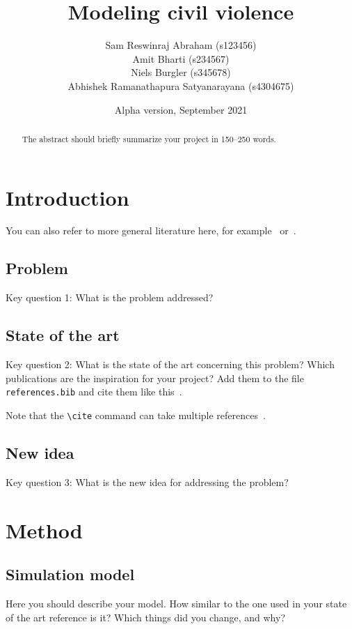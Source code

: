 \documentclass[a4paper,11pt]{article}
\title{Modeling civil violence}
\author{
  Sam Reswinraj Abraham (s123456)
  \\
  Amit Bharti (s234567)
  \\
  Niels Burgler (s345678)
  \\
  Abhishek Ramanathapura Satyanarayana (s4304675)
}
\date{Alpha version, September 2021} %
\begin{document}
\maketitle

\begin{abstract}
The abstract should briefly summarize your project in 150--250 words.
\end{abstract}

\section{Introduction}

You can also refer to more general literature here, for example~\cite{WooldridgeMAS} or~\cite{wiki:SchellingSegregation}.

\subsection{Problem}

Key question 1: What is the problem addressed?

\subsection{State of the art}

Key question 2: What is the state of the art concerning this problem?
Which publications are the inspiration for your project?
Add them to the file \texttt{references.bib} and cite them like this~\cite{dWVV2013:ToM}.

Note that the \verb|\cite| command can take multiple references~\cite{vDGKK2019:ReachGossip,vdBerg2019:UnreliableGossip,HvKLL2019:SupermarketQ}.

\subsection{New idea}

Key question 3: What is the new idea for addressing the problem?

\section{Method}

\subsection{Simulation model}

Here you should describe your model.
How similar to the one used in your state of the art reference is it?
Which things did you change, and why?
\end{document}
